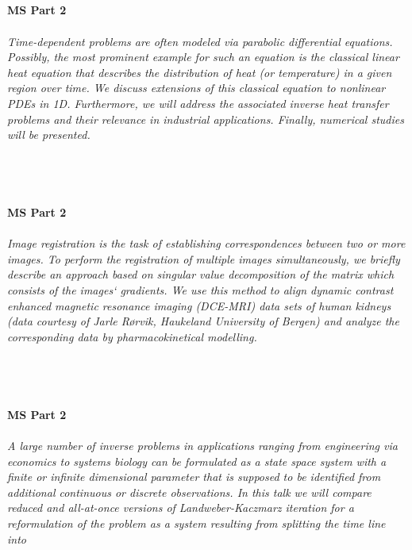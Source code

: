 \begin{multicols}{2}
\\ 
    \\
    \\\\
    \noindent\textbf{MS Part 2}\\
\\  
    \textit{Time-dependent problems are often modeled via parabolic differential equations. Possibly, the most prominent example for such an equation is the classical linear heat equation that describes the distribution of heat (or temperature) in a given region over time. We discuss extensions of this classical equation to nonlinear PDEs in 1D. Furthermore, we will address the associated inverse heat transfer problems and their relevance in industrial applications. Finally, numerical studies will be presented.}\\
\\ 
    \\
    \\\\
    \noindent\textbf{MS Part 2}\\
\\  
    \textit{Image registration is the task of establishing correspondences between two or more images. To perform the registration of multiple images simultaneously, we briefly describe an approach based on singular value decomposition of the matrix which consists of the images‘ gradients. We use this method to align dynamic contrast enhanced magnetic resonance imaging (DCE-MRI) data sets of human kidneys (data courtesy of Jarle Rørvik, Haukeland University of Bergen) and analyze the corresponding data by pharmacokinetical modelling.}\\
\\ 
    \\
    \\\\
    \noindent\textbf{MS Part 2}\\
\\  
    \textit{A large number of inverse problems in applications ranging from engineering via economics to systems biology can be formulated as a state space system with a finite or infinite dimensional parameter that is supposed to be identified from additional continuous or discrete observations. In this talk we will compare reduced and all-at-once versions of Landweber-Kaczmarz iteration for a reformulation of the problem as a system resulting from splitting the time line into
}
\end{multicols}
